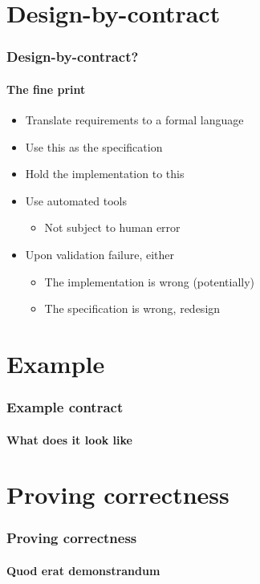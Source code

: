 \documentclass[presentation]{beamer}   %
\begin{document}
\section{Design-by-contract}
\begin{frame}
  \frametitle{Design-by-contract?}
  \framesubtitle{The fine print}
  \begin{itemize}
    \item Translate requirements to a formal language
    \item Use this as the specification
    \item Hold the implementation to this
	\item Use automated tools
      \begin{itemize}
        \item Not subject to human error
      \end{itemize}
    \item Upon validation failure, either
      \begin{itemize}
        \item The implementation is wrong (potentially)
        \item The specification is wrong, redesign
      \end{itemize}  
  \end{itemize}
\end{frame}

\section{Example}
\begin{frame}
  \frametitle{Example contract}
  \framesubtitle{What does it look like}

\end{frame}

\section{Proving correctness}
\begin{frame}
  \frametitle{Proving correctness}
  \framesubtitle{Quod erat demonstrandum}
\end{frame}
\end{document}
